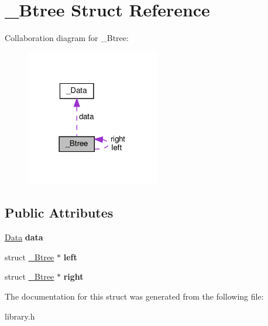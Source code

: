 \hypertarget{struct__Btree}{}\section{\+\_\+\+Btree Struct Reference}
\label{struct__Btree}


Collaboration diagram for \+\_\+\+Btree\+:
\nopagebreak
\begin{figure}[H]
\begin{center}
\leavevmode
\includegraphics[width=165pt]{struct__Btree__coll__graph}
\end{center}
\end{figure}
\subsection*{Public Attributes}
\begin{DoxyCompactItemize}
\item 
\mbox{\label{struct__Btree_a8f210f6335be3cf206adbcfd390dd4bc}} 
\hyperlink{struct__Data}{Data} {\bfseries data}
\item 
\mbox{\label{struct__Btree_a25f05500ebe2cf740236e1aa18d9e085}} 
struct \hyperlink{struct__Btree}{\+\_\+\+Btree} $\ast$ {\bfseries left}
\item 
\mbox{\label{struct__Btree_a4dd47df91cb75b5884d36cb95b7ec3eb}} 
struct \hyperlink{struct__Btree}{\+\_\+\+Btree} $\ast$ {\bfseries right}
\end{DoxyCompactItemize}


The documentation for this struct was generated from the following file\+:\begin{DoxyCompactItemize}
\item 
library.\+h\end{DoxyCompactItemize}

